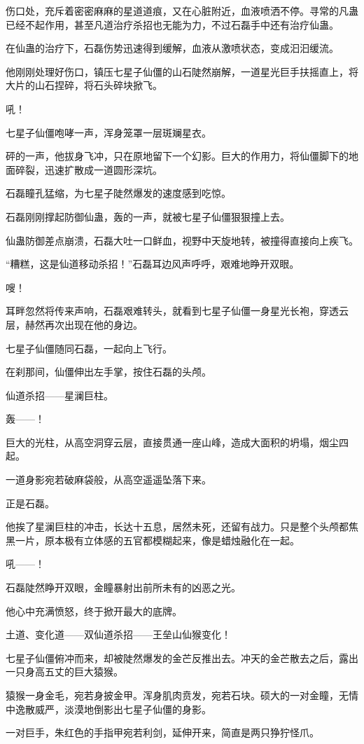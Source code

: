 \begin{this_body}
伤口处，充斥着密密麻麻的星道道痕，又在心脏附近，血液喷洒不停。寻常的凡蛊已经不起作用，甚至凡道治疗杀招也无能为力，不过石磊手中还有治疗仙蛊。

在仙蛊的治疗下，石磊伤势迅速得到缓解，血液从激喷状态，变成汩汩缓流。

他刚刚处理好伤口，镇压七星子仙僵的山石陡然崩解，一道星光巨手扶摇直上，将大片的山石捏碎，将石头碎块掀飞。

吼！

七星子仙僵咆哮一声，浑身笼罩一层斑斓星衣。

砰的一声，他拔身飞冲，只在原地留下一个幻影。巨大的作用力，将仙僵脚下的地面碎裂，迅速扩散成一道圆形深坑。

石磊瞳孔猛缩，为七星子陡然爆发的速度感到吃惊。

石磊刚刚撑起防御仙蛊，轰的一声，就被七星子仙僵狠狠撞上去。

仙蛊防御差点崩溃，石磊大吐一口鲜血，视野中天旋地转，被撞得直接向上疾飞。

“糟糕，这是仙道移动杀招！”石磊耳边风声呼呼，艰难地睁开双眼。

嗖！

耳畔忽然将传来声响，石磊艰难转头，就看到七星子仙僵一身星光长袍，穿透云层，赫然再次出现在他的身边。

七星子仙僵随同石磊，一起向上飞行。

在刹那间，仙僵伸出左手掌，按住石磊的头颅。

仙道杀招——星澜巨柱。

轰——！

巨大的光柱，从高空洞穿云层，直接贯通一座山峰，造成大面积的坍塌，烟尘四起。

一道身影宛若破麻袋般，从高空遥遥坠落下来。

正是石磊。

他挨了星澜巨柱的冲击，长达十五息，居然未死，还留有战力。只是整个头颅都焦黑一片，原本极有立体感的五官都模糊起来，像是蜡烛融化在一起。

吼——！

石磊陡然睁开双眼，金瞳暴射出前所未有的凶恶之光。

他心中充满愤怒，终于掀开最大的底牌。

土道、变化道——双仙道杀招——王垒山仙猴变化！

七星子仙僵俯冲而来，却被陡然爆发的金芒反推出去。冲天的金芒散去之后，露出一只身高五丈的巨大猿猴。

猿猴一身金毛，宛若身披金甲。浑身肌肉贲发，宛若石块。硕大的一对金瞳，无情中逸散威严，淡漠地倒影出七星子仙僵的身影。

一对巨手，朱红色的手指甲宛若利剑，延伸开来，简直是两只狰狞怪爪。


\end{this_body}
